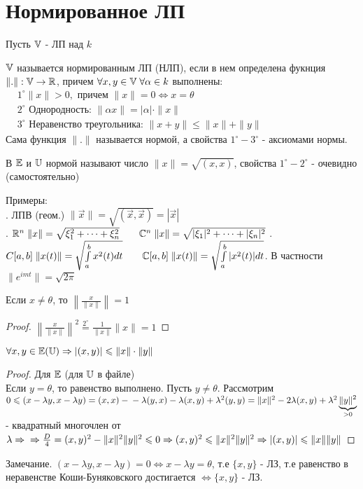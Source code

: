 \documentclass[../main.tex]{subfiles}
\begin{document}
\section{Нормированное ЛП} 
Пусть $\V$ - ЛП над $k$
\begin{definition}
    $\V$ называется нормированным ЛП (НЛП), если в нем определена фукнция $\|.\|: \V\to \R$, причем $\forall x ,y \in \V \; \forall \alpha \in k $ выполнены:$
    \begin{aligned}
        &1^{\circ} \|x\| >0 , \text{ причем } \|x\| =0 \Leftrightarrow x=\theta\\
        &2^{\circ} \text{ Однородность: } \|\alpha x\| = |\alpha| \cdot \|x\|\\
        &3^{\circ} \text{ Неравенство треугольника: } \|x+y\| \leqslant \|x\| + \|y\|
    \end{aligned}$
    \\ Сама функция $\|.\|$ называется нормой, а свойства $1^{\circ}-3^{\circ}$ - аксиомами нормы.
\end{definition}
В $\E$ и $\U$ нормой называют число $\|x\| = \sqrt{(x,x)}$, свойства $1^{\circ}-2^{\circ}$ - очевидно (самостоятельно)
  
Примеры: \\ 
. ЛПВ (геом.)\; $\|\vec{x}\| = \sqrt{(\vec{x},\vec{x})}=|\vec{x}|$\\ 
. $\R^{n}\; \| x\| = \sqrt{\xi_{1}^{2}+\dots+\xi_{n}^{2}} \qquad \C^{n} \; \|x\| = \sqrt{ |\xi_{1}|^{2}+\dots+|\xi_{n}|^{2}} \\ $
. $C[a,b] \; \|x(t)\| = \sqrt{\int\limits_{a }^{b    } x^{2}(t)dt} \qquad \C [a,b] \; \|x(t)\| = \sqrt{\int\limits_{a    }^{b    } |x^{2}(t)|dt}$. В частности $\|e^{imt}\| = \sqrt{2\pi}$
\begin{lemma}
    Если $x\neq  \theta$, то $\left\|\frac{x}{\|x\|}\right\| = 1$
\end{lemma}
\begin{proof}
    $\left\| \frac{x}{\|x\|}\right\| ^{2} \overset{2^{\circ}}{=} \frac{1}{\|x\|}\|x\| = 1 $
\end{proof}
\begin{theorem}
    $\forall x,y \in \E ( \U) \implies |(x,y)| \leqslant \|x\| \cdot \|y\|$
\end{theorem}
\begin{proof}
    Для $\E$ (для $\U$ в файле)
    \\ Если $y=\theta$, то равенство выполнено. Пусть $y\neq \theta$. Рассмотрим $0\leqslant(x-\lambda y, x- \lambda y)= (x,x)-\\-\lambda (y,x)- \lambda(x,y) + \lambda^{2}(y,y) = \|x\|^{2}-2\lambda (x,y)+\lambda^{2} \underbrace{\|y\|^{2}}_{>0}$ - квадратный многочлен от $\lambda \implies\\\implies \frac{D}{4 } = (x,y)^{2}-\|x\|^{2}\|y\|^{2}\leqslant 0 \implies (x,y)^{2}\leqslant\|x\|^{2}\|y\|^{2}\implies |(x,y)| \leqslant \|x\|\|y\|$
\end{proof}
Замечание. $(x-\lambda y, x-\lambda y)= 0 \Leftrightarrow x-\lambda y = \theta$, т.е $\{x,y\}$ - ЛЗ, т.е равенство в неравенстве Коши-Буняковского достигается $\Leftrightarrow \{x,y\}$ - ЛЗ. 
\end{document}
